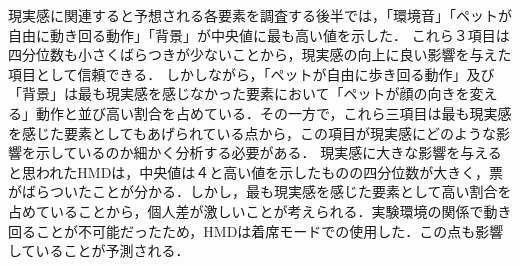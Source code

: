 \begin{table}[H]
\centering
\caption{質問紙後半の分析結果}
\label{table:analysis2}
\end{table}

現実感に関連すると予想される各要素を調査する後半では，「環境音」「ペットが自由に動き回る動作」「背景」が中央値に最も高い値を示した．
これら３項目は四分位数も小さくばらつきが少ないことから，現実感の向上に良い影響を与えた項目として信頼できる．
しかしながら，「ペットが自由に歩き回る動作」及び「背景」は最も現実感を感じなかった要素において「ペットが顔の向きを変える」動作と並び高い割合を占めている．その一方で，これら三項目は最も現実感を感じた要素としてもあげられている点から，この項目が現実感にどのような影響を示しているのか細かく分析する必要がある．
現実感に大きな影響を与えると思われたHMDは，中央値は４と高い値を示したものの四分位数が大きく，票がばらついたことが分かる．しかし，最も現実感を感じた要素として高い割合を占めていることから，個人差が激しいことが考えられる．実験環境の関係で動き回ることが不可能だったため，HMDは着席モードでの使用した．この点も影響していることが予測される．


